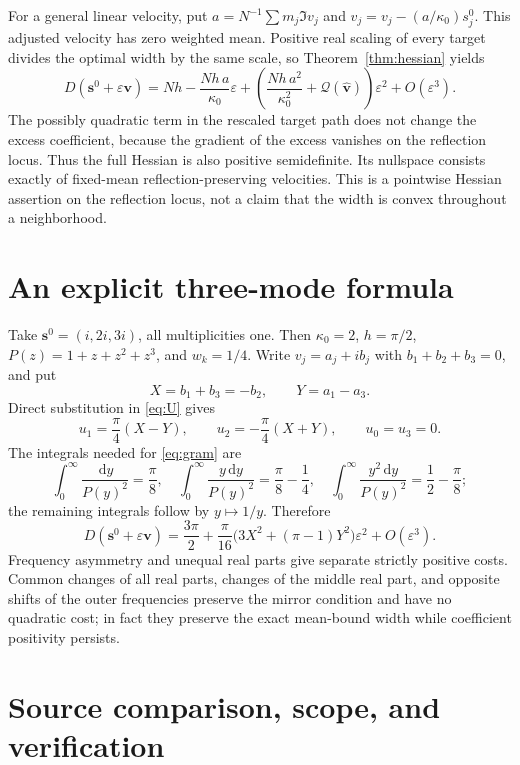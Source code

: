 \documentclass[11pt]{article}
\theoremstyle{remark}\newtheorem{remark}[theorem]{Remark}
\newcommand{\dd}{\,\mathrm d}
\begin{document}
For a general linear velocity, put $a=N^{-1}\sum m_j\Im v_j$ and $\widehat v_j=v_j-(a/\kappa_0)s_j^0$. This adjusted velocity has zero weighted mean. Positive real scaling of every target divides the optimal width by the same scale, so Theorem~\ref{thm:hessian} yields
\begin{equation}\label{eq:allhessian}
 D(\boldsymbol s^0+\varepsilon\boldsymbol v)
 =Nh-\frac{Nh\,a}{\kappa_0}\varepsilon
 +\left(\frac{Nh\,a^2}{\kappa_0^2}+\mathcal Q(\widehat{\boldsymbol v})\right)\varepsilon^2
 +O(\varepsilon^3).
\end{equation}
The possibly quadratic term in the rescaled target path does not change the excess coefficient, because the gradient of the excess vanishes on the reflection locus. Thus the full Hessian is also positive semidefinite. Its nullspace consists exactly of fixed-mean reflection-preserving velocities. This is a pointwise Hessian assertion on the reflection locus, not a claim that the width is convex throughout a neighborhood.

\section{An explicit three-mode formula}

Take $\boldsymbol s^0=(i,2i,3i)$, all multiplicities one. Then $\kappa_0=2$, $h=\pi/2$, $P(z)=1+z+z^2+z^3$, and $w_k=1/4$. Write $v_j=a_j+ib_j$ with $b_1+b_2+b_3=0$, and put
\[
 X=b_1+b_3=-b_2,\qquad Y=a_1-a_3.
\]
Direct substitution in \eqref{eq:U} gives
\[
 u_1=\frac\pi4(X-Y),\qquad
 u_2=-\frac\pi4(X+Y),\qquad u_0=u_3=0.
\]
The integrals needed for \eqref{eq:gram} are
\[
 \int_0^\infty\frac{\dd y}{P(y)^2}=\frac\pi8,
 \quad\int_0^\infty\frac{y\dd y}{P(y)^2}=\frac\pi8-\frac14,
 \quad\int_0^\infty\frac{y^2\dd y}{P(y)^2}=\frac12-\frac\pi8;
\]
the remaining integrals follow by $y\mapsto1/y$. Therefore
\begin{equation}\label{eq:triple}
 \boxed{\quad D(\boldsymbol s^0+\varepsilon\boldsymbol v)
 =\frac{3\pi}{2}+\frac\pi{16}
 \bigl(3X^2+(\pi-1)Y^2\bigr)\varepsilon^2+O(\varepsilon^3).\quad}
\end{equation}
Frequency asymmetry and unequal real parts give separate strictly positive costs. Common changes of all real parts, changes of the middle real part, and opposite shifts of the outer frequencies preserve the mirror condition and have no quadratic cost; in fact they preserve the exact mean-bound width while coefficient positivity persists.

\section{Source comparison, scope, and verification}
\end{document}
